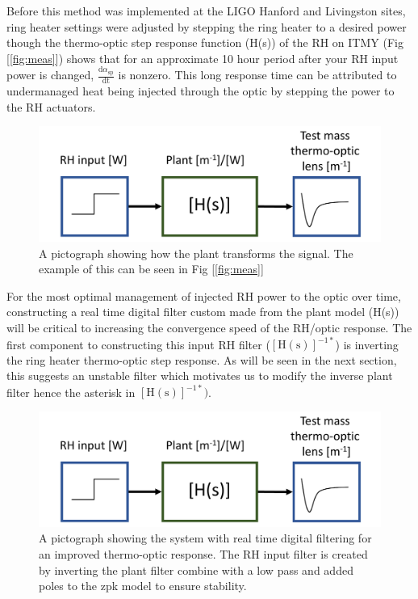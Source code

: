 \documentclass[colorlinks=true,pdfstartview=FitV,linkcolor=blue,
            citecolor=magenta,urlcolor=red]{ligodoc}
\begin{document}
Before this method was implemented at the LIGO Hanford and Livingston sites, ring heater settings were adjusted by stepping the ring heater to a desired power though the thermo-optic step response function (H(s)) of the RH on ITMY (Fig [\ref{fig:meas}]) shows that for an approximate 10 hour period after your RH input power is changed,  $\frac{\mathrm{d}\alpha_{\mathrm{sp}}}{\mathrm{dt}}$ is nonzero. This long response time can be attributed to undermanaged heat being injected through the optic by stepping the power to the RH actuators.

\begin{figure}[H]
\includegraphics[page=1,width=\textwidth]{figures/RH_input_filter_figures.pdf}
\caption{A pictograph showing how the plant transforms the signal. The example of this can be seen in Fig [\ref{fig:meas}]}
\label{fig:justplant}
\end{figure}

For the most optimal management of injected RH power to the optic over time, constructing a real time digital filter custom made from the plant model (H(s)) will be critical to increasing the convergence speed of the RH/optic response. The first component to constructing this input RH filter ($[\mathrm{H}(\mathrm{s})]^{-1*}$) is inverting the ring heater thermo-optic step response. As will be seen in the next section, this suggests an unstable filter which motivates us to modify the inverse plant filter hence the asterisk in $[\mathrm{H}(\mathrm{s})]^{-1*})$.

\begin{figure}[H]
\includegraphics[page=2,width=\textwidth]{figures/RH_input_filter_figures.pdf}
\caption{A pictograph showing the system with real time digital filtering for an improved thermo-optic response. The RH input filter is created by inverting the plant filter combine with a low pass and added poles to the zpk model to ensure stability. }
\label{fig:plantwfilt}
\end{figure}
\end{document}
